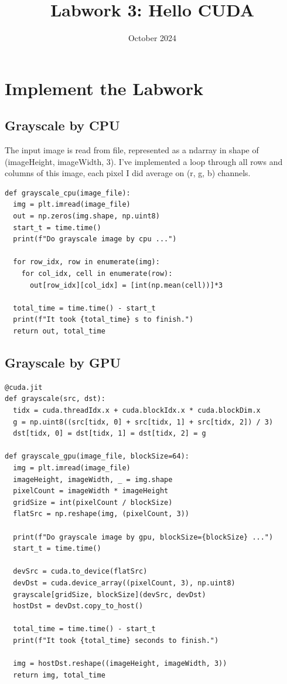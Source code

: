 \documentclass{article}
\begin{document}
\title{Labwork 3: Hello CUDA}
\date{October 2024}

\section{Implement the Labwork}
\subsection{Grayscale by CPU}
The input image is read from file, represented as a ndarray in shape of (imageHeight, imageWidth, 3).
I've implemented a loop through all rows and columns of this image, each pixel I did average on (r, g, b) channels.
\begin{verbatim}
def grayscale_cpu(image_file):
  img = plt.imread(image_file)
  out = np.zeros(img.shape, np.uint8)
  start_t = time.time()
  print(f"Do grayscale image by cpu ...")

  for row_idx, row in enumerate(img):
    for col_idx, cell in enumerate(row):
      out[row_idx][col_idx] = [int(np.mean(cell))]*3

  total_time = time.time() - start_t
  print(f"It took {total_time} s to finish.")
  return out, total_time
\end{verbatim}

\subsection{Grayscale by GPU}
\begin{verbatim}
@cuda.jit
def grayscale(src, dst):
  tidx = cuda.threadIdx.x + cuda.blockIdx.x * cuda.blockDim.x
  g = np.uint8((src[tidx, 0] + src[tidx, 1] + src[tidx, 2]) / 3)
  dst[tidx, 0] = dst[tidx, 1] = dst[tidx, 2] = g

def grayscale_gpu(image_file, blockSize=64):
  img = plt.imread(image_file)
  imageHeight, imageWidth, _ = img.shape
  pixelCount = imageWidth * imageHeight
  gridSize = int(pixelCount / blockSize)
  flatSrc = np.reshape(img, (pixelCount, 3))

  print(f"Do grayscale image by gpu, blockSize={blockSize} ...")
  start_t = time.time()

  devSrc = cuda.to_device(flatSrc)
  devDst = cuda.device_array((pixelCount, 3), np.uint8)
  grayscale[gridSize, blockSize](devSrc, devDst)
  hostDst = devDst.copy_to_host()

  total_time = time.time() - start_t
  print(f"It took {total_time} seconds to finish.")

  img = hostDst.reshape((imageHeight, imageWidth, 3))
  return img, total_time
\end{verbatim}
\end{document}
